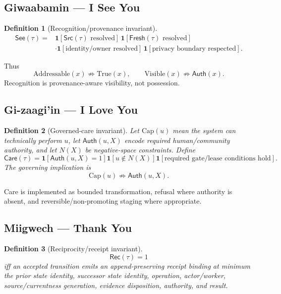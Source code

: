 \documentclass[11pt]{article}
\newtheorem{definition}{Definition}
\newcommand{\See}{\mathsf{See}}
\newcommand{\Care}{\mathsf{Care}}
\newcommand{\Rec}{\mathsf{Rec}}
\newcommand{\Auth}{\mathsf{Auth}}
\newcommand{\Src}{\mathsf{Src}}
\newcommand{\Fresh}{\mathsf{Fresh}}
\newcommand{\one}{\mathbf{1}}
\begin{document}
\subsection{Giwaabamin --- I See You}

\begin{definition}[Recognition/provenance invariant]
\[
\begin{aligned}
\See(\tau)={}&\one[\Src(\tau)\text{ resolved}]\,
\one[\Fresh(\tau)\text{ resolved}]\\
&\cdot\one[\text{identity/owner resolved}]\,
\one[\text{privacy boundary respected}].
\end{aligned}
\]
\end{definition}

Thus
\[
\mathrm{Addressable}(x)\not\Rightarrow\mathrm{True}(x),
\qquad
\mathrm{Visible}(x)\not\Rightarrow\Auth(x).
\]
Recognition is provenance-aware visibility, not possession.

\subsection{Gi-zaagi'in --- I Love You}

\begin{definition}[Governed-care invariant]
Let \(\mathrm{Cap}(u)\) mean the system can technically perform \(u\), let \(\Auth(u,X)\) encode required human/community authority, and let \(N(X)\) be negative-space constraints. Define
\[
\Care(\tau)=
\one[\Auth(u,X)=1]
\one[u\notin N(X)]
\one[\text{required gate/lease conditions hold}].
\]
The governing implication is
\[
\mathrm{Cap}(u)\not\Rightarrow\Auth(u,X).
\]
\end{definition}

Care is implemented as bounded transformation, refusal where authority is absent, and reversible/non-promoting staging where appropriate.

\subsection{Miigwech --- Thank You}

\begin{definition}[Reciprocity/receipt invariant]
\[
\Rec(\tau)=1
\]
iff an accepted transition emits an append-preserving receipt binding at minimum the prior state identity, successor state identity, operation, actor/worker, source/currentness generation, evidence disposition, authority, and result.
\end{definition}
\end{document}
